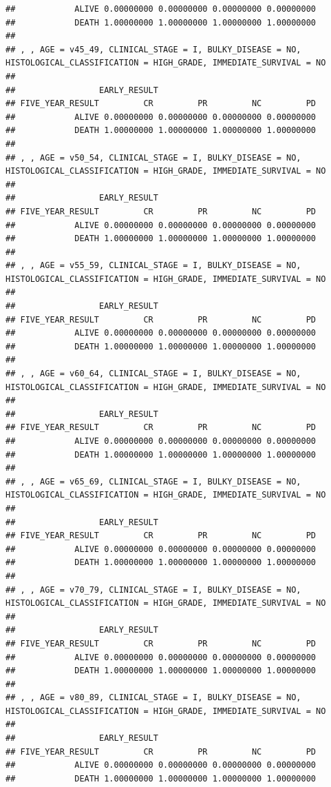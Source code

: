 \documentclass[]{article}
\begin{document}
\begin{verbatim}
##            ALIVE 0.00000000 0.00000000 0.00000000 0.00000000
##            DEATH 1.00000000 1.00000000 1.00000000 1.00000000
## 
## , , AGE = v45_49, CLINICAL_STAGE = I, BULKY_DISEASE = NO, HISTOLOGICAL_CLASSIFICATION = HIGH_GRADE, IMMEDIATE_SURVIVAL = NO
## 
##                 EARLY_RESULT
## FIVE_YEAR_RESULT         CR         PR         NC         PD
##            ALIVE 0.00000000 0.00000000 0.00000000 0.00000000
##            DEATH 1.00000000 1.00000000 1.00000000 1.00000000
## 
## , , AGE = v50_54, CLINICAL_STAGE = I, BULKY_DISEASE = NO, HISTOLOGICAL_CLASSIFICATION = HIGH_GRADE, IMMEDIATE_SURVIVAL = NO
## 
##                 EARLY_RESULT
## FIVE_YEAR_RESULT         CR         PR         NC         PD
##            ALIVE 0.00000000 0.00000000 0.00000000 0.00000000
##            DEATH 1.00000000 1.00000000 1.00000000 1.00000000
## 
## , , AGE = v55_59, CLINICAL_STAGE = I, BULKY_DISEASE = NO, HISTOLOGICAL_CLASSIFICATION = HIGH_GRADE, IMMEDIATE_SURVIVAL = NO
## 
##                 EARLY_RESULT
## FIVE_YEAR_RESULT         CR         PR         NC         PD
##            ALIVE 0.00000000 0.00000000 0.00000000 0.00000000
##            DEATH 1.00000000 1.00000000 1.00000000 1.00000000
## 
## , , AGE = v60_64, CLINICAL_STAGE = I, BULKY_DISEASE = NO, HISTOLOGICAL_CLASSIFICATION = HIGH_GRADE, IMMEDIATE_SURVIVAL = NO
## 
##                 EARLY_RESULT
## FIVE_YEAR_RESULT         CR         PR         NC         PD
##            ALIVE 0.00000000 0.00000000 0.00000000 0.00000000
##            DEATH 1.00000000 1.00000000 1.00000000 1.00000000
## 
## , , AGE = v65_69, CLINICAL_STAGE = I, BULKY_DISEASE = NO, HISTOLOGICAL_CLASSIFICATION = HIGH_GRADE, IMMEDIATE_SURVIVAL = NO
## 
##                 EARLY_RESULT
## FIVE_YEAR_RESULT         CR         PR         NC         PD
##            ALIVE 0.00000000 0.00000000 0.00000000 0.00000000
##            DEATH 1.00000000 1.00000000 1.00000000 1.00000000
## 
## , , AGE = v70_79, CLINICAL_STAGE = I, BULKY_DISEASE = NO, HISTOLOGICAL_CLASSIFICATION = HIGH_GRADE, IMMEDIATE_SURVIVAL = NO
## 
##                 EARLY_RESULT
## FIVE_YEAR_RESULT         CR         PR         NC         PD
##            ALIVE 0.00000000 0.00000000 0.00000000 0.00000000
##            DEATH 1.00000000 1.00000000 1.00000000 1.00000000
## 
## , , AGE = v80_89, CLINICAL_STAGE = I, BULKY_DISEASE = NO, HISTOLOGICAL_CLASSIFICATION = HIGH_GRADE, IMMEDIATE_SURVIVAL = NO
## 
##                 EARLY_RESULT
## FIVE_YEAR_RESULT         CR         PR         NC         PD
##            ALIVE 0.00000000 0.00000000 0.00000000 0.00000000
##            DEATH 1.00000000 1.00000000 1.00000000 1.00000000

\end{verbatim}
\end{document}
